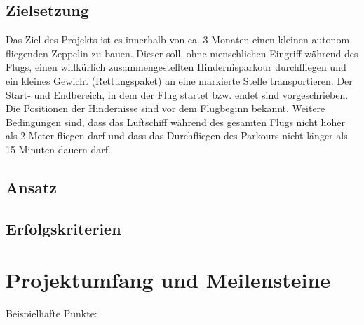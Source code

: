 \documentclass[lang=ngerman,inputenc=utf8,fontsize=10pt]{ldvarticle}
\begin{document}
\subsection*{Zielsetzung}
Das Ziel des Projekts ist es innerhalb von ca. 3 Monaten einen kleinen autonom fliegenden Zeppelin zu bauen. Dieser soll, ohne menschlichen Eingriff während des Flugs, einen willkürlich zusammengestellten Hindernisparkour durchfliegen und ein kleines Gewicht (Rettungspaket) an eine markierte Stelle transportieren. Der Start- und Endbereich, in dem der Flug startet bzw. endet sind vorgeschrieben. Die Positionen der Hindernisse sind vor dem Flugbeginn bekannt. Weitere Bedingungen sind, dass das Luftschiff während des gesamten Flugs nicht höher als 2 Meter fliegen darf und dass das Durchfliegen des Parkours nicht länger als 15 Minuten dauern darf. 

\subsection*{Ansatz}

\subsection*{Erfolgskriterien}

\section{Projektumfang und Meilensteine}

Beispielhafte Punkte:
\end{document}
